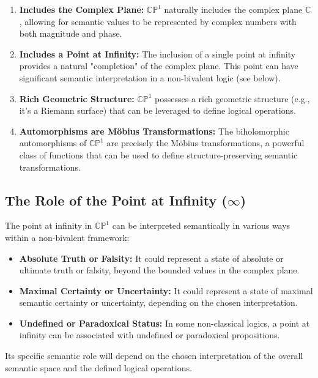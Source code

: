 	\begin{enumerate}
		\item \textbf{Includes the Complex Plane:} $\mathbb{CP}^1$ naturally includes the complex plane $\mathbb{C}$, allowing for semantic values to be represented by complex numbers with both magnitude and phase.
		
		\item \textbf{Includes a Point at Infinity:} The inclusion of a single point at infinity provides a natural "completion" of the complex plane. This point can have significant semantic interpretation in a non-bivalent logic (see below).
		
		\item \textbf{Rich Geometric Structure:} $\mathbb{CP}^1$ possesses a rich geometric structure (e.g., it's a Riemann surface) that can be leveraged to define logical operations.
		
		\item \textbf{Automorphisms are M\"{o}bius Transformations:} The biholomorphic automorphisms of $\mathbb{CP}^1$ are precisely the M\"{o}bius transformations, a powerful class of functions that can be used to define structure-preserving semantic transformations.
	\end{enumerate}
	
	\subsection{The Role of the Point at Infinity ($\infty$)}
	
	The point at infinity in $\mathbb{CP}^1$ can be interpreted semantically in various ways within a non-bivalent framework:
	
	\begin{itemize}
		\item \textbf{Absolute Truth or Falsity:} It could represent a state of absolute or ultimate truth or falsity, beyond the bounded values in the complex plane.
		
		\item \textbf{Maximal Certainty or Uncertainty:} It could represent a state of maximal semantic certainty or uncertainty, depending on the chosen interpretation.
		
		\item \textbf{Undefined or Paradoxical Status:} In some non-classical logics, a point at infinity can be associated with undefined or paradoxical propositions.
	\end{itemize}
	Its specific semantic role will depend on the chosen interpretation of the overall semantic space and the defined logical operations.
	
